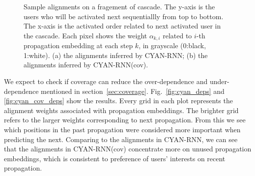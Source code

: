 \begin{figure}
\centering
{}
\caption{Sample alignments on a fragement of cascade. The y-axis is the users
who will be activated next sequentiallly from top to bottom. The x-axis is the
activated order related to next activated user in the cascade. Each pixel shows
the weight $\alpha_{k,i}$ related to $i$-th propagation embedding at each step
$k$, in grayscale (0:black, 1:white). (a) the alignments inferred by CYAN-RNN; (b) the
alignments inferred by CYAN-RNN(cov).
}
\end{figure}

We expect to check if coverage can reduce the over-dependence and
under-dependence mentioned in section~\ref{sec:coverage}.
Fig.~\ref{fig:cyan_deps} and \ref{fig:cyan_cov_deps} show the results. Every grid
in each plot represents the alignment weights associated with propagation
embeddings.
The brighter grid refers to the larger weights corresponding to next
propagation. From this we see which positions in the past propagation
were considered more important when predicting the next. Comparing to
the alignments in CYAN-RNN, we can see that the alignments in CYAN-RNN(cov)
concentrate more on unused propagation embeddings, which is consistent to
preference of users' interests on recent propagation. 

